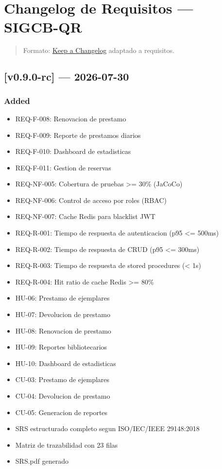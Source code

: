 \documentclass[
11pt,
a4paper,
]{report}
\providecommand{\tightlist}{%
	\setlength{\itemsep}{0pt}\setlength{\parskip}{0pt}}
\begin{document}
	\hypertarget{changelog-de-requisitos-sigcb-qr}{%
		\section{Changelog de Requisitos --- SIGCB-QR}\label{changelog-de-requisitos-sigcb-qr}}
	
	\begin{quote}
		Formato: \href{https://keepachangelog.com/}{Keep a Changelog} adaptado a requisitos.
	\end{quote}
	
	\hypertarget{v0.9.0-rc-2026-07-30}{%
		\subsection{{[}v0.9.0-rc{]} --- 2026-07-30}\label{v0.9.0-rc-2026-07-30}}
	
	\hypertarget{added}{%
		\subsubsection{Added}\label{added}}
	
	\begin{itemize}
		\tightlist
		\item
		REQ-F-008: Renovacion de prestamo
		\item
		REQ-F-009: Reporte de prestamos diarios
		\item
		REQ-F-010: Dashboard de estadisticas
		\item
		REQ-F-011: Gestion de reservas
		\item
		REQ-NF-005: Cobertura de pruebas \textgreater= 30\% (JaCoCo)
		\item
		REQ-NF-006: Control de acceso por roles (RBAC)
		\item
		REQ-NF-007: Cache Redis para blacklist JWT
		\item
		REQ-R-001: Tiempo de respuesta de autenticacion (p95 \textless= 500ms)
		\item
		REQ-R-002: Tiempo de respuesta de CRUD (p95 \textless= 300ms)
		\item
		REQ-R-003: Tiempo de respuesta de stored procedures (\textless{} 1s)
		\item
		REQ-R-004: Hit ratio de cache Redis \textgreater= 80\%
		\item
		HU-06: Prestamo de ejemplares
		\item
		HU-07: Devolucion de prestamo
		\item
		HU-08: Renovacion de prestamo
		\item
		HU-09: Reportes bibliotecarios
		\item
		HU-10: Dashboard de estadisticas
		\item
		CU-03: Prestamo de ejemplares
		\item
		CU-04: Devolucion de prestamo
		\item
		CU-05: Generacion de reportes
		\item
		SRS estructurado completo segun ISO/IEC/IEEE 29148:2018
		\item
		Matriz de trazabilidad con 23 filas
		\item
		SRS.pdf generado
	\end{itemize}
	
\end{document}
